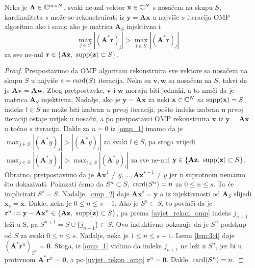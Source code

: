 \documentclass[a4paper,twoside,12pt]{memoir} %
\newcommand{\vect}[1]{\mathbf{#1}}
\renewcommand{\vec}{\vect}
\newcommand{\card}{\text{\normalfont{card}}}
\newcommand{\supp}{\text{\normalfont{supp}}}
\begin{document}
\begin{prop}\label{prop:3:5}
    Neka je $\vec A \in \C^{m \times N}$, svaki ne-nul vektor $\vec x \in \C^N$ s nosa\v{c}em na skupu $S$, kardinaliteta $s$ mo\v{z}e se rekonstruirati iz $\vec y = \vec{Ax}$ u najvi\v{s}e $s$ iteracija OMP algoritma ako i samo ako je matrica $\vec A_S$ injektivna i 
    \begin{equation}\label{uvjet_rekon_omp}
        \max_{j \in S}|(\vec A^* \vec r)_j| > \max_{l \in \bar{S}}|(\vec A^* \vec r)_l|
    \end{equation}
    za sve ne-nul $\vec r \in \{\vec{Az},\ \supp(\vec z) \subset S\}$.
\end{prop}
\begin{proof}
    Pretpostavimo da OMP algoritam rekonstruira sve vektore sa nosa\v{c}em na skupu $S$ u najvi\v{s}e $s = \card(S)$ iteracija. Neka su $\vec v, \vec w$ sa nosa\v{c}em na $S$, takvi da je $\vec{Av}=\vec{Aw}$. Zbog pretpostavke, $\vec v$ i $\vec w$ moraju biti jednaki, a to zna\v{c}i da je matrica $\vec A_S$ injektivna. Nadalje, ako je $\vec y = \vec{Ax}$ za neki $\vec x \in \C^N$ sa $\supp(\vec x)=S$, indeks $l \in \bar S$ ne mo\v{z}e biti izabran u prvoj iteraciji, po\v{s}to indeks izabran u prvoj iteraciji ostaje uvijek u nosa\v{c}u, a po pretpostavci OMP rekonstruira $\vec x$ iz $\vec y = \vec{Ax}$ u to\v{c}no $s$ iteracija. Dakle za $n=0$ iz \eqref{omp_1} imamo da je $\max_{j \in S}|(\vec A^*y)_j| > |(\vec A^*y)_l|$ za svaki $l \in \bar{S}$, pa stoga vrijedi $\max_{j \in S}|(\vec A^*y)_j| > \max_{l \in \bar{S}}|(\vec A^*y)_l|$ za sve ne-nul $\vec y \in \{\vec{Az},\ \supp(\vec z) \subset S\}$. \\
    \indent
    Obratno, pretpostavimo da je $\vec{Ax}^1 \neq y,\dots,\vec{Ax}^{s-1} \neq y$ jer u suprotnom nemamo \v{s}to dokazivati. Pokazati \'cemo da $S^n \subset S,\ \card(S^n)=n$ za $0 \leq n \leq s$. To \'ce implicirati $S^s = S$. Nadalje, \eqref{omp_2} daje $\vec{Ax}^s = \vec y$ a iz injektivnosti od $\vec{A}_S$ slijedi $\vec x_s = \vec{x}$. Dakle, neka je $0 \leq n \leq s-1$. Ako je $S^n \subset S$, to povla\v{c}i da je $\vec r^n := \vec y - \vec{Ax}^n \in \{\vec{Az},\ \supp(\vec z) \subset S\}$, pa prema \eqref{uvjet_rekon_omp} indeks $j_{n+1}$ le\v{z}i u S, pa $S^{n+1} = S \cup \{j_{n+1}\} \subset S$. Ovo induktivno pokazuje da je $S^n$ podskup od $S$ za svaki $0 \leq n \leq s$. Nadalje, neka je $1 \leq n \leq s-1$. Lema \eqref{lem:3:4} daje $(\vec{A}^* \vec r^n)_{S^n} = \vec 0$. Stoga, iz \eqref{omp_1} vidimo da indeks $j_{n+1}$ ne le\v{z}i u $S^{n}$, jer bi u protivnom $\vec A^* \vec r^n = \vec 0$, a po \eqref{uvjet_rekon_omp} $\vec r^n = \vec 0$. Dakle, $\card(S^n)=n$.
\end{proof}
\end{document}
